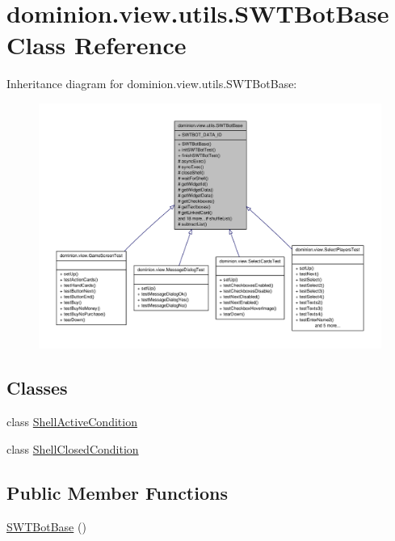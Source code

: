 \hypertarget{classdominion_1_1view_1_1utils_1_1SWTBotBase}{\section{dominion.\-view.\-utils.\-S\-W\-T\-Bot\-Base \-Class \-Reference}
\label{classdominion_1_1view_1_1utils_1_1SWTBotBase}
}


\-Inheritance diagram for dominion.\-view.\-utils.\-S\-W\-T\-Bot\-Base\-:
\nopagebreak
\begin{figure}[H]
\begin{center}
\leavevmode
\includegraphics[width=350pt]{classdominion_1_1view_1_1utils_1_1SWTBotBase__inherit__graph}
\end{center}
\end{figure}
\subsection*{\-Classes}
\begin{DoxyCompactItemize}
\item 
class \hyperlink{classdominion_1_1view_1_1utils_1_1SWTBotBase_1_1ShellActiveCondition}{\-Shell\-Active\-Condition}
\item 
class \hyperlink{classdominion_1_1view_1_1utils_1_1SWTBotBase_1_1ShellClosedCondition}{\-Shell\-Closed\-Condition}
\end{DoxyCompactItemize}
\subsection*{\-Public \-Member \-Functions}
\begin{DoxyCompactItemize}
\item 
\hyperlink{classdominion_1_1view_1_1utils_1_1SWTBotBase_aa8635cff99c75e44d051356e98d345eb}{\-S\-W\-T\-Bot\-Base} ()
\end{DoxyCompactItemize}

